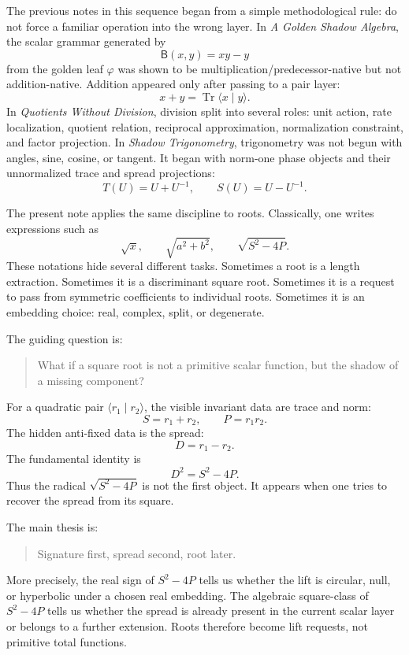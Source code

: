 \documentclass[11pt]{article}
\newcommand{\B}{\mathsf{B}}
\newcommand{\Tr}{\operatorname{Tr}}
\newcommand{\ph}{\varphi}
\begin{document}
The previous notes in this sequence began from a simple methodological rule: do not force a familiar operation into the wrong layer.  In \emph{A Golden Shadow Algebra}, the scalar grammar generated by
\[
    \B(x,y)=xy-y
\]
from the golden leaf $\ph$ was shown to be multiplication/predecessor-native but not addition-native.  Addition appeared only after passing to a pair layer:
\[
    x+y=\Tr\langle x\mid y\rangle.
\]
In \emph{Quotients Without Division}, division split into several roles: unit action, rate localization, quotient relation, reciprocal approximation, normalization constraint, and factor projection.  In \emph{Shadow Trigonometry}, trigonometry was not begun with angles, sine, cosine, or tangent.  It began with norm-one phase objects and their unnormalized trace and spread projections:
\[
    T(U)=U+U^{-1},
    \qquad
    S(U)=U-U^{-1}.
\]

The present note applies the same discipline to roots.  Classically, one writes expressions such as
\[
    \sqrt{x},
    \qquad
    \sqrt{a^2+b^2},
    \qquad
    \sqrt{S^2-4P}.
\]
These notations hide several different tasks.  Sometimes a root is a length extraction.  Sometimes it is a discriminant square root.  Sometimes it is a request to pass from symmetric coefficients to individual roots.  Sometimes it is an embedding choice: real, complex, split, or degenerate.

The guiding question is:
\begin{quote}
What if a square root is not a primitive scalar function, but the shadow of a missing component?
\end{quote}

For a quadratic pair $\langle r_1\mid r_2\rangle$, the visible invariant data are trace and norm:
\[
    S=r_1+r_2,
    \qquad
    P=r_1r_2.
\]
The hidden anti-fixed data is the spread:
\[
    D=r_1-r_2.
\]
The fundamental identity is
\[
    D^2=S^2-4P.
\]
Thus the radical $\sqrt{S^2-4P}$ is not the first object.  It appears when one tries to recover the spread from its square.

The main thesis is:
\begin{quote}
Signature first, spread second, root later.
\end{quote}

More precisely, the real sign of $S^2-4P$ tells us whether the lift is circular, null, or hyperbolic under a chosen real embedding.  The algebraic square-class of $S^2-4P$ tells us whether the spread is already present in the current scalar layer or belongs to a further extension.  Roots therefore become lift requests, not primitive total functions.
\end{document}
